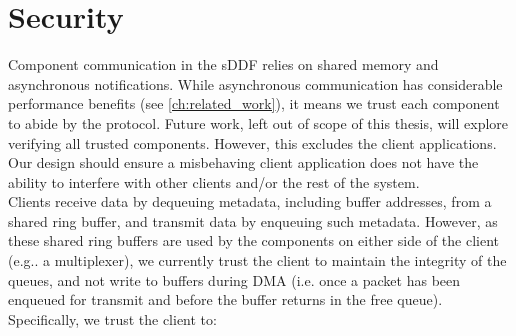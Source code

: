 \section{Security}\label{s:security}
Component communication in the sDDF relies on shared memory and asynchronous notifications. While asynchronous communication
has considerable performance benefits (see \autoref{ch:related_work}), it means we trust each component to abide by the protocol. 
Future work, left out of scope of this thesis, will explore verifying all trusted components. However, this excludes the client
applications. Our design should ensure a 
misbehaving client application does not have the ability to interfere with other clients and/or the rest of the system.\\

Clients receive data by dequeuing metadata, including buffer addresses, from a shared ring buffer, and transmit data by enqueuing such metadata. 
However, as these shared ring buffers are used by the components on either side of the client (e.g.. a multiplexer), we currently 
trust the client to maintain the integrity of the queues, and not write to buffers during DMA (i.e. once a packet has been enqueued
for transmit and before the buffer returns in the free queue). Specifically, we trust the client to:
